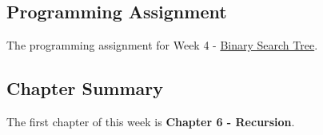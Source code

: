 \subsection{Programming Assignment}

The programming assignment for Week 4 - \href{https://github.com/QuantumCompiler/CU/tree/main/CSPB%202270%20-%20Data%20Structures/CSPB%202270%20-%20Programming%20Assignments/CSPB%202270%20-%20Assignment%203%20-%20Binary%20Search%20Tree}{Binary Search Tree}.

\subsection{Chapter Summary}

The first chapter of this week is \textbf{Chapter 6 - Recursion}.

